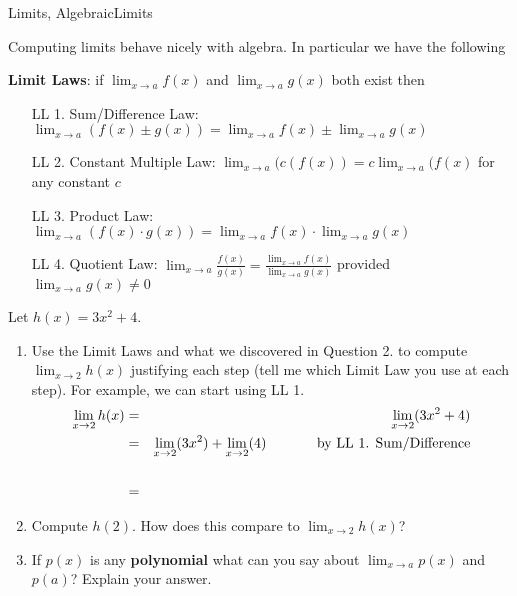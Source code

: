 

\begin{tagblock}{Limits, AlgebraicLimits}
\begin{question}
	Computing limits behave nicely with algebra.  In particular we have the following
\bigskip

 \textbf{Limit Laws}:  if $\lim_{x \to a} f(x)$ and $\lim_{x \to a} g(x)$ both exist then
\begin{enumerate}
\item[LL 1.] Sum/Difference Law: $\displaystyle \lim_{x \to a} (f(x) \pm g(x) ) = \lim_{x \to a} f(x) \pm \lim_{x \to a} g(x) $
\item[LL 2.] Constant Multiple Law: $\displaystyle \lim_{x \to a} (c(f(x)) = c \lim_{x \to a} (f(x)$ for any constant $c$
\item[LL 3.]Product Law:  $\displaystyle \lim_{x \to a} (f(x) \cdot g(x) ) = \lim_{x \to a} f(x) \cdot \lim_{x \to a} g(x) $
\item[LL 4.]Quotient Law: $\displaystyle \lim_{x \to a} \frac{f(x)}{g(x) } =  \frac{\lim_{x \to a} f(x)}{\lim_{x \to a} g(x) }$ provided $\lim_{x \to a} g(x) \neq 0$
\end{enumerate}

\newpage

\item Let $h(x) = 3x^2 + 4$. 
\begin{enumerate}
\item Use the Limit Laws and what we discovered in Question 2. to compute $ \lim_{x \to 2} h(x)$ justifying each step (tell me which Limit Law you use at each step).  For example, we can start using LL 1.
\begin{eqnarray*}
 \lim_{x \to 2} h(x) &=&  \lim_{x \to 2} (3x^2 + 4) \\
 &=&  \lim_{x \to 2} (3x^2) +  \lim_{x \to 2} (4) \hspace{.5in} \text{by LL 1. Sum/Difference} \\ \\
 & = & 
 \end{eqnarray*}
\vspace{2.5in}

\item Compute $h(2)$.  How does this compare to $ \lim_{x \to 2} h(x)$?

\vspace{.5in}
\item If $p(x)$ is any \textbf{polynomial} what can you say about $\lim_{x \to a} p(x)$ and $p(a)$?  Explain your answer.  


\end{enumerate}
\end{question}
\end{tagblock}
